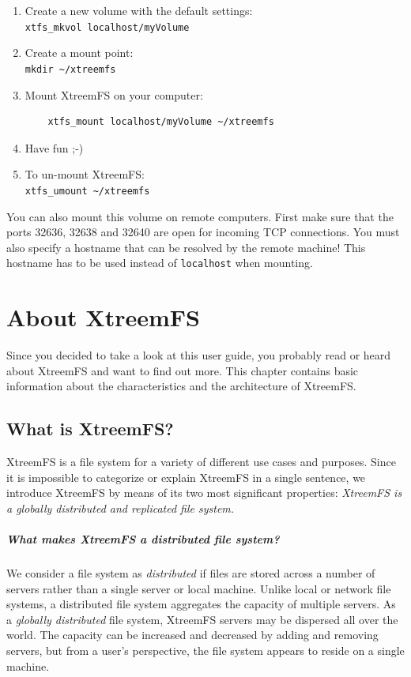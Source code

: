 \documentclass[a4paper,10pt]{book}
\begin{document}
\begin{enumerate}
\item Create a new volume with the default settings:\\
	\texttt{xtfs\_mkvol localhost/myVolume}

\item Create a mount point:\\
	\texttt{mkdir \~{}/xtreemfs}

\item Mount XtreemFS on your computer:
	\begin{verbatim}
	xtfs_mount localhost/myVolume ~/xtreemfs
	\end{verbatim}


\item Have fun ;-)

\item To un-mount XtreemFS:\\
	\texttt{xtfs\_umount \~{}/xtreemfs}
\end{enumerate}

You can also mount this volume on remote computers. First make sure that the ports 32636, 32638 and 32640 are open for incoming TCP connections. You must also specify a hostname that can be resolved by the remote machine! This hostname has to be used instead of \texttt{localhost} when mounting.

\chapter{About XtreemFS}
\setcounter{page}{1}

Since you decided to take a look at this user guide, you probably read or heard about XtreemFS and want to find out more. This chapter contains basic information about the characteristics and the architecture of XtreemFS.

\section{What is XtreemFS?}
XtreemFS is a file system for a variety of different use cases and purposes. Since it is impossible to categorize or explain XtreemFS in a single sentence, we introduce XtreemFS by means of its two most significant properties: \emph{XtreemFS is a globally distributed and replicated file system.}

\paragraph{What makes XtreemFS a distributed file system?} We consider a file system as \emph{distributed} if files are stored across a number of servers rather than a single server or local machine. Unlike local or network file systems, a distributed file system aggregates the capacity of multiple servers. As a \emph{globally distributed} file system, XtreemFS servers may be dispersed all over the world. The capacity can be increased and decreased by adding and removing servers, but from a user's perspective, the file system appears to reside on a single machine.
\end{document}
